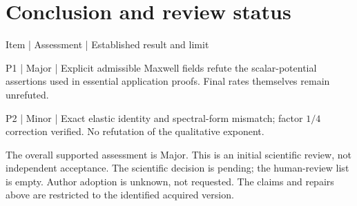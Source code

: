 \documentclass[10pt]{article}
\begin{document}
\section*{Conclusion and review status}
Item | Assessment | Established result and limit\par
P1 | Major | Explicit admissible Maxwell fields refute the scalar-potential assertions used in essential application proofs. Final rates themselves remain unrefuted.\par
P2 | Minor | Exact elastic identity and spectral-form mismatch; factor \(1/4\) correction verified. No refutation of the qualitative exponent.\par
The overall supported assessment is Major. This is an initial scientific review, not independent acceptance. The scientific decision is pending; the human-review list is empty. Author adoption is unknown, not requested. The claims and repairs above are restricted to the identified acquired version.\par
\end{document}
